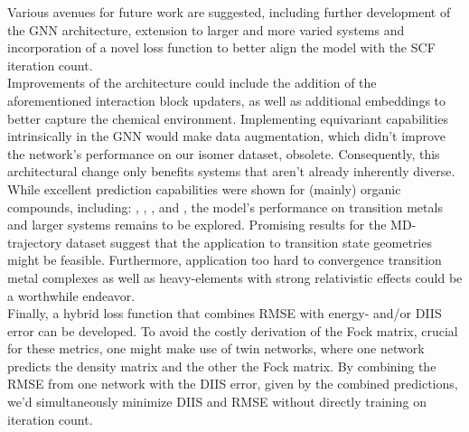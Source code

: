 Various avenues for future work are suggested, including further development of the GNN architecture, extension to larger and more varied systems and incorporation of a novel loss function to better align the model with the SCF iteration count. \\
Improvements of the architecture could include the addition of the aforementioned interaction block updaters, as well as additional embeddings to better capture the chemical environment. Implementing equivariant capabilities intrinsically in the GNN would make data augmentation, which didn't improve the network's performance on our isomer dataset, obsolete. Consequently, this architectural change only benefits systems that aren't already inherently diverse.  \\
While excellent prediction capabilities were shown for (mainly) organic compounds, including: , , ,  and , the model's performance on transition metals and larger systems remains to be explored. Promising results for the MD-trajectory dataset suggest that the application to transition state geometries might be feasible.
Furthermore, application too hard to convergence transition metal complexes as well as heavy-elements with strong relativistic effects could be a worthwhile endeavor. \\
Finally, a hybrid loss function that combines RMSE with energy- and/or DIIS error can be developed. To avoid the costly derivation of the Fock matrix, crucial for these metrics, one might make use of twin networks, where one network predicts the density matrix and the other the Fock matrix. By combining the RMSE from one network with the DIIS error, given by the combined predictions, we'd simultaneously minimize DIIS and RMSE without directly training on iteration count.
